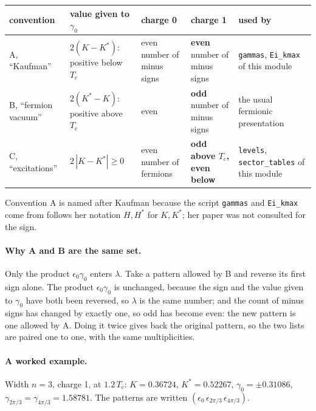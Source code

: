\documentclass[11pt]{article}
\newcommand\code[1]{\texttt{#1}}
\begin{document}
\begin{center}\small\renewcommand{\arraystretch}{1.15}%
\begin{tabular}{@{}>{\raggedright\arraybackslash}p{2.9cm}>{\raggedright\arraybackslash}p{2.7cm}>{\raggedright\arraybackslash}p{2.3cm}>{\raggedright\arraybackslash}p{2.8cm}>{\raggedright\arraybackslash}p{4.0cm}@{}}
\toprule
convention & value given to $\gamma_0$ & charge 0 & charge 1 & used by \\
\midrule
A, ``Kaufman'' & $2(K - K^*)$: positive below $T_c$ & even number of minus signs &
  \textbf{even} number of minus signs & \code{gammas}, \code{Ei\_kmax} of this module \\[2pt]
B, ``fermion vacuum'' & $2(K^* - K)$: positive above $T_c$ & even &
  \textbf{odd} number of minus signs & the usual fermionic presentation \\[2pt]
C, ``excitations'' & $2\,|K - K^*| \ge 0$ & even number of fermions &
  \textbf{odd above $T_c$, even below} & \code{levels}, \code{sector\_tables} of this module \\
\bottomrule
\end{tabular}\end{center}

Convention A is named after Kaufman because the script \code{gammas} and \code{Ei\_kmax} come
from follows her notation $H, H^*$ for $K, K^*$; her paper was not consulted for the sign.

\paragraph{Why A and B are the same set.}  Only the product $\epsilon_0 \gamma_0$ enters
$\lambda$.  Take a pattern allowed by B and reverse its first sign alone.  The product
$\epsilon_0 \gamma_0$ is unchanged, because the sign and the value given to $\gamma_0$ have both
been reversed, so $\lambda$ is the same number; and the count of minus signs has changed by
exactly one, so odd has become even: the new pattern is one allowed by A.  Doing it twice gives
back the original pattern, so the two lists are paired one to one, with the same multiplicities.

\paragraph{A worked example.}  Width $n = 3$, charge 1, at $1.2\,T_c$: $K = 0.36724$,
$K^* = 0.52267$, $\gamma_0 = \pm 0.31086$, $\gamma_{2\pi/3} = \gamma_{4\pi/3} = 1.58781$.  The
patterns are written $(\epsilon_0\, \epsilon_{2\pi/3}\, \epsilon_{4\pi/3})$.
\end{document}
